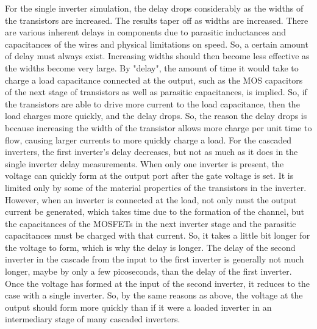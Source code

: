 For the single inverter simulation, the delay drops considerably as the widths of the transistors are increased. The results taper off as widths are increased. There are various inherent delays in components due to parasitic inductances and capacitances of the wires and physical limitations on speed. So, a certain amount of delay must always exist. Increasing widths should then become less effective as the widths become very large.
By "delay", the amount of time it would take to charge a load capacitance connected at the output, such as the MOS capacitors of the next stage of transistors as well as parasitic capacitances, is implied. So, if the transistors are able to drive more current to the load capacitance, then the load charges more quickly, and the delay drops. So, the reason the delay drops is because increasing the width of the transistor allows more charge per unit time to flow, causing larger currents to more quickly charge a load.
For the cascaded inverters, the first inverter's delay decreases, but not as much as it does in the single inverter delay measurements. When only one inverter is present, the voltage can quickly form at the output port after the gate voltage is set. It is limited only by some of the material properties of the transistors in the inverter. However, when an inverter is connected at the load, not only must the output current be generated, which takes time due to the formation of the channel, but the capacitances of the MOSFETs in the next inverter stage and the parasitic capacitances must be charged with that current. So, it takes a little bit longer for the voltage to form, which is why the delay is longer.
The delay of the second inverter in the cascade from the input to the first inverter is generally not much longer, maybe by only a few picoseconds, than the delay of the first inverter. Once the voltage has formed at the input of the second inverter, it reduces to the case with a single inverter. So, by the same reasons as above, the voltage at the output should form more quickly than if it were a loaded inverter in an intermediary stage of many cascaded inverters.
